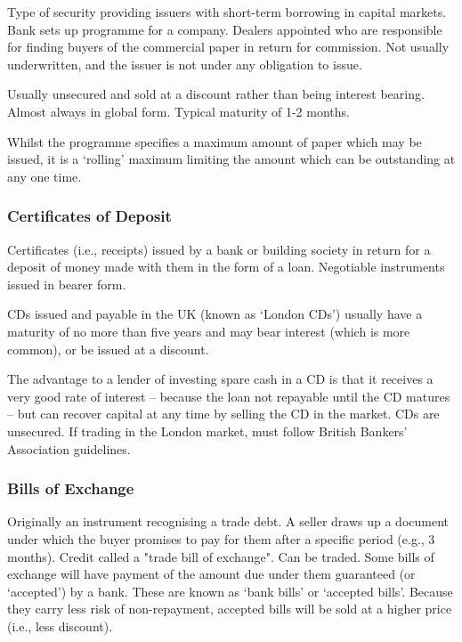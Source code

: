 \documentclass[
]{article}
\begin{document}
Type of security providing issuers with short-term borrowing in capital
markets. Bank sets up programme for a company. Dealers appointed who are
responsible for finding buyers of the commercial paper in return for
commission. Not usually underwritten, and the issuer is not under any
obligation to issue.

Usually unsecured and sold at a discount rather than being interest
bearing. Almost always in global form. Typical maturity of 1-2 months.

Whilst the programme specifies a maximum amount of paper which may be
issued, it is a `rolling' maximum limiting the amount which can be
outstanding at any one time.

\hypertarget{certificates-of-deposit}{%
\subsubsection{Certificates of Deposit}\label{certificates-of-deposit}}

Certificates (i.e., receipts) issued by a bank or building society in
return for a deposit of money made with them in the form of a loan.
Negotiable instruments issued in bearer form.

CDs issued and payable in the UK (known as `London CDs') usually have a
maturity of no more than five years and may bear interest (which is more
common), or be issued at a discount.

The advantage to a lender of investing spare cash in a CD is that it
receives a very good rate of interest -- because the loan not repayable
until the CD matures -- but can recover capital at any time by selling
the CD in the market. CDs are unsecured. If trading in the London
market, must follow British Bankers' Association guidelines.

\hypertarget{bills-of-exchange}{%
\subsubsection{Bills of Exchange}\label{bills-of-exchange}}

Originally an instrument recognising a trade debt. A seller draws up a
document under which the buyer promises to pay for them after a specific
period (e.g., 3 months). Credit called a "trade bill of exchange". Can
be traded. Some bills of exchange will have payment of the amount due
under them guaranteed (or `accepted') by a bank. These are known as
`bank bills' or `accepted bills'. Because they carry less risk of
non-repayment, accepted bills will be sold at a higher price (i.e., less
discount).
\end{document}
